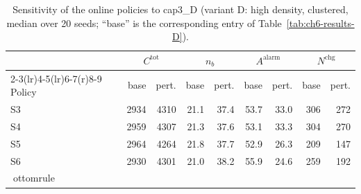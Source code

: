 \begin{table}[htbp]
\centering
\caption{Sensitivity of the online policies to cap3_D (variant D: high density, clustered,
median over 20 seeds; ``base'' is the corresponding entry of
Table~\ref{tab:ch6-results-D}).}
\label{tab:ch6-sens-D-cap3}
\footnotesize
\begin{tabular}{@{}l rr rr rr rr@{}}
\toprule
& \multicolumn{2}{c}{$C^{\mathrm{tot}}$} & \multicolumn{2}{c}{$n_b$}
  & \multicolumn{2}{c}{$A^{\mathrm{alarm}}$} & \multicolumn{2}{c}{$N^{\mathrm{chg}}$} \\
\cmidrule(r){2-3}\cmidrule(lr){4-5}\cmidrule(lr){6-7}\cmidrule(r){8-9}
Policy & base & pert. & base & pert. & base & pert. & base & pert. \\
\midrule

S3 & 2934 & 4310 & 21.1 & 37.4 & 53.7 & 33.0 & 306 & 272 \\
S4 & 2959 & 4307 & 21.3 & 37.6 & 53.1 & 33.3 & 304 & 270 \\
S5 & 2964 & 4264 & 21.8 & 37.7 & 52.9 & 26.3 & 209 & 147 \\
S6 & 2930 & 4301 & 21.0 & 38.2 & 55.9 & 24.6 & 259 & 192 \\
ottomrule
\end{tabular}
\end{table}
